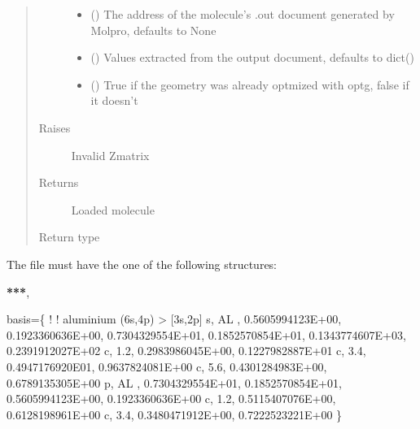 \documentclass[letterpaper,10pt,english]{sphinxmanual}
\begin{document}
\begin{fulllineitems}
\begin{fulllineitems}
\begin{quote}
\begin{description}
\begin{itemize}
\item {} 
\sphinxAtStartPar
{} (\sphinxstyleliteralemphasis{\sphinxupquote{, }}) \textendash{} The address of the molecule’s .out document generated by Molpro, defaults to None

\item {} 
\sphinxAtStartPar
{} (\sphinxstyleliteralemphasis{\sphinxupquote{{[}}}\sphinxstyleliteralemphasis{\sphinxupquote{, }}\sphinxstyleliteralemphasis{\sphinxupquote{{]}}}\sphinxstyleliteralemphasis{\sphinxupquote{, }}) \textendash{} Values extracted from the output document, defaults to dict()

\item {} 
\sphinxAtStartPar
{} (\sphinxstyleliteralemphasis{\sphinxupquote{, }}) \textendash{} True if the geometry was already optmized with optg, false if it doesn’t

\end{itemize}

\item[{Raises}] \leavevmode
\sphinxAtStartPar
{} \textendash{} Invalid Z\sphinxhyphen{}matrix

\item[{Returns}] \leavevmode
\sphinxAtStartPar
Loaded molecule

\item[{Return type}] \leavevmode
\sphinxAtStartPar
{\hyperref[\detokenize{molecular:molecular.Molecule}]{}}

\end{description}\end{quote}

\sphinxAtStartPar
The file must have the one of the following structures:

\sphinxAtStartPar
{\color{red}\bfseries{}**}{\color{red}\bfseries{}*},

\sphinxAtStartPar
basis=\{
!
! aluminium            (6s,4p) \sphinxhyphen{}\textgreater{} {[}3s,2p{]}
s, AL , 0.5605994123E+00, 0.1923360636E+00, 0.7304329554E+01, 0.1852570854E+01, 0.1343774607E+03, 0.2391912027E+02
c, 1.2, \sphinxhyphen{}0.2983986045E+00, 0.1227982887E+01
c, 3.4, 0.4947176920E\sphinxhyphen{}01, 0.9637824081E+00
c, 5.6, 0.4301284983E+00, 0.6789135305E+00
p, AL , 0.7304329554E+01, 0.1852570854E+01, 0.5605994123E+00, 0.1923360636E+00
c, 1.2, 0.5115407076E+00, 0.6128198961E+00
c, 3.4, 0.3480471912E+00, 0.7222523221E+00
\}


\end{fulllineitems}
\end{fulllineitems}
\end{document}
